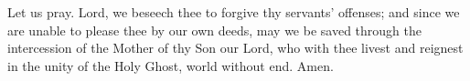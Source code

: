 \noindent Let us pray. Lord, we beseech thee to forgive thy servants' offenses; and since we are unable to please thee by our own deeds, may we be saved through the intercession of the Mother of thy Son our Lord, who with thee livest and reignest in the unity of the Holy Ghost, world without end. Amen.